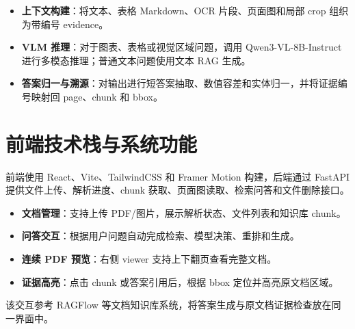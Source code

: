 \begin{itemize}
  \item \textbf{上下文构建}：将文本、表格 Markdown、OCR 片段、页面图和局部 crop 组织为带编号 evidence。
  \item \textbf{VLM 推理}：对于图表、表格或视觉区域问题，调用 Qwen3-VL-8B-Instruct 进行多模态推理；普通文本问题使用文本 RAG 生成。
  \item \textbf{答案归一与溯源}：对输出进行短答案抽取、数值容差和实体归一，并将证据编号映射回 page、chunk 和 bbox。
\end{itemize}

\section{前端技术栈与系统功能}

前端使用 React、Vite、TailwindCSS 和 Framer Motion 构建，后端通过 FastAPI 提供文件上传、解析进度、chunk 获取、页面图读取、检索问答和文件删除接口。

\begin{itemize}
  \item \textbf{文档管理}：支持上传 PDF/图片，展示解析状态、文件列表和知识库 chunk。
  \item \textbf{问答交互}：根据用户问题自动完成检索、模型决策、重排和生成。
  \item \textbf{连续 PDF 预览}：右侧 viewer 支持上下翻页查看完整文档。
  \item \textbf{证据高亮}：点击 chunk 或答案引用后，根据 bbox 定位并高亮原文档区域。
\end{itemize}

该交互参考 RAGFlow 等文档知识库系统\cite{ragflow}，将答案生成与原文档证据检查放在同一界面中。
